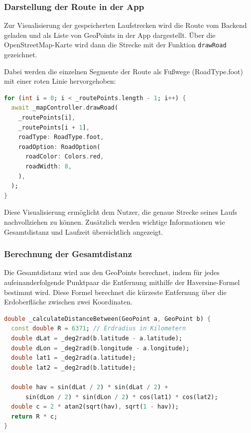 \documentclass[11pt,a4paper]{article}
\begin{document}
\subsubsection{Darstellung der Route in der App}

Zur Visualisierung der gespeicherten Laufstrecken wird die Route vom Backend geladen und als Liste von GeoPoints in der App dargestellt. Über die OpenStreetMap-Karte wird dann die Strecke mit der Funktion \texttt{drawRoad} gezeichnet.

Dabei werden die einzelnen Segmente der Route als Fußwege (RoadType.foot) mit einer roten Linie hervorgehoben:

\begin{lstlisting}[language=Dart, caption=Zeichnen der Route auf der Karte]
for (int i = 0; i < _routePoints.length - 1; i++) {
  await _mapController.drawRoad(
    _routePoints[i],
    _routePoints[i + 1],
    roadType: RoadType.foot,
    roadOption: RoadOption(
      roadColor: Colors.red,
      roadWidth: 8,
    ),
  );
}
\end{lstlisting}

Diese Visualisierung ermöglicht dem Nutzer, die genaue Strecke seines Laufs nachvollziehen zu können. Zusätzlich werden wichtige Informationen wie Gesamtdistanz und Laufzeit übersichtlich angezeigt.

\subsubsection{Berechnung der Gesamtdistanz}

Die Gesamtdistanz wird aus den GeoPoints berechnet, indem für jedes aufeinanderfolgende Punktpaar die Entfernung mithilfe der Haversine-Formel bestimmt wird. Diese Formel berechnet die kürzeste Entfernung über die Erdoberfläche zwischen zwei Koordinaten.

\begin{lstlisting}[language=Dart, caption=Berechnung der Entfernung zweier GeoPoints]
double _calculateDistanceBetween(GeoPoint a, GeoPoint b) {
  const double R = 6371; // Erdradius in Kilometern
  double dLat = _deg2rad(b.latitude - a.latitude);
  double dLon = _deg2rad(b.longitude - a.longitude);
  double lat1 = _deg2rad(a.latitude);
  double lat2 = _deg2rad(b.latitude);

  double hav = sin(dLat / 2) * sin(dLat / 2) +
      sin(dLon / 2) * sin(dLon / 2) * cos(lat1) * cos(lat2);
  double c = 2 * atan2(sqrt(hav), sqrt(1 - hav));
  return R * c;
}
\end{lstlisting}
\end{document}
